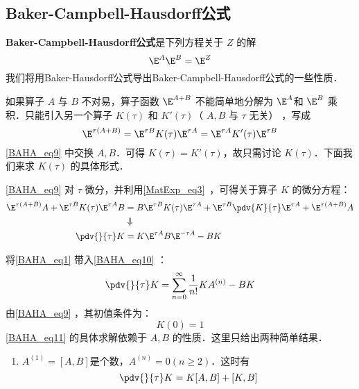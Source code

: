 \subsection{Baker-Campbell-Hausdorff公式}
\textbf{Baker-Campbell-Hausdorff公式}是下列方程关于 $Z$ 的解
\begin{equation}
\E^{A}\E^{B}=\E^{Z}
\end{equation}
我们将用Baker-Hausdorff公式导出Baker-Campbell-Hausdorff公式的一些性质．

如果算子 $A$ 与 $B$ 不对易，算子函数 $\E^{A+B}$ 不能简单地分解为  $\E^{A}$和 $\E^{B}$ 乘积．只能引入另一个算子 $K(\tau)$ 和 $K'(\tau)$（ $A,B$ 与 $\tau$ 无关） ，写成
\begin{equation}\label{BAHA_eq9}
\E^{\tau(A+B)}=\E^{\tau B}K(\tau)\E^{\tau A}=\E^{\tau A}K'(\tau)\E^{\tau B}
\end{equation}
\autoref{BAHA_eq9} 中交换 $A,B$．可得 $K(\tau)=K'(\tau)$，故只需讨论 $K(\tau)$．下面我们来求 $K(\tau)$ 的具体形式．

\autoref{BAHA_eq9} 对 $\tau$ 微分，并利用\autoref{MatExp_eq3}~，可得关于算子 $K$ 的微分方程：
\begin{equation}\label{BAHA_eq10}
\begin{aligned}
\E^{\tau(A+B)}A+\E^{\tau B}K(\tau)\E^{\tau A}B&=B\E^{\tau B}K(\tau)\E^{\tau A}+\E^{\tau B}\pdv{K}{\tau}\E^{\tau A}+\E^{\tau(A+B)}A\\
&\Downarrow\\
\pdv{}{\tau}K&=K\E^{\tau A}B\E^{-\tau A}-BK
\end{aligned}
\end{equation}

将\autoref{BAHA_eq1} 带入\autoref{BAHA_eq10} ：
\begin{equation}\label{BAHA_eq11}
\pdv{}{\tau}K=\sum_{n=0}^{\infty}\frac{1}{n!}KA^{(n)}-BK
\end{equation}
由\autoref{BAHA_eq9} ，其初值条件为：
\begin{equation}
K(0)=1
\end{equation}
\autoref{BAHA_eq11} 的具体求解依赖于 $A,B$ 的性质．这里只给出两种简单结果．
\begin{enumerate}
\item $A^{(1)}=[A,B]$是个数，$A^{(n)}=0(n\geq 2)$．这时有
\begin{equation}
\pdv{}{\tau}K=K[A,B]+[K,B]
\end{equation}

\end{enumerate}


